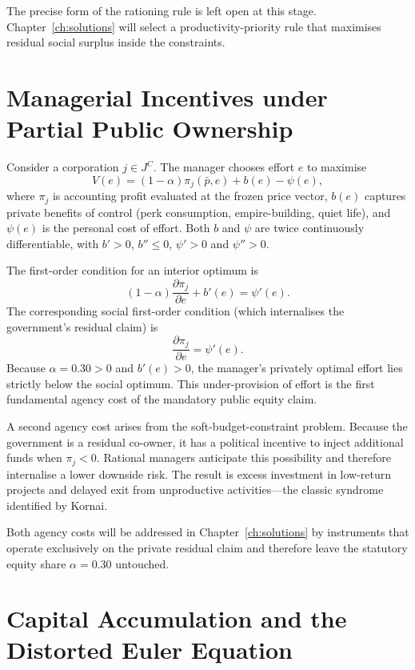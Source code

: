 \documentclass[12pt,anyside]{book}
\theoremstyle{definition}
\theoremstyle{plain}
\theoremstyle{remark}
\begin{document}
The precise form of the rationing rule is left open at this stage. Chapter~\ref{ch:solutions} will select a productivity-priority rule that maximises residual social surplus inside the constraints.

\section{Managerial Incentives under Partial Public Ownership}

Consider a corporation $j\in J^C$. The manager chooses effort $e$ to maximise
\begin{equation}
V(e)=(1-\alpha)\pi_j(\bar{p},e)+b(e)-\psi(e),
\end{equation}
where $\pi_j$ is accounting profit evaluated at the frozen price vector, $b(e)$ captures private benefits of control (perk consumption, empire-building, quiet life), and $\psi(e)$ is the personal cost of effort. Both $b$ and $\psi$ are twice continuously differentiable, with $b'>0$, $b''\le0$, $\psi'>0$ and $\psi''>0$.

The first-order condition for an interior optimum is
\begin{equation}
(1-\alpha)\frac{\partial\pi_j}{\partial e}+b'(e)=\psi'(e).
\end{equation}
The corresponding social first-order condition (which internalises the government’s residual claim) is
\begin{equation}
\frac{\partial\pi_j}{\partial e}=\psi'(e).
\end{equation}
Because $\alpha=0.30>0$ and $b'(e)>0$, the manager’s privately optimal effort lies strictly below the social optimum. This under-provision of effort is the first fundamental agency cost of the mandatory public equity claim.

A second agency cost arises from the soft-budget-constraint problem. Because the government is a residual co-owner, it has a political incentive to inject additional funds when $\pi_j<0$. Rational managers anticipate this possibility and therefore internalise a lower downside risk. The result is excess investment in low-return projects and delayed exit from unproductive activities—the classic syndrome identified by Kornai.

Both agency costs will be addressed in Chapter~\ref{ch:solutions} by instruments that operate exclusively on the private residual claim and therefore leave the statutory equity share $\alpha=0.30$ untouched.

\section{Capital Accumulation and the Distorted Euler Equation}
\end{document}
